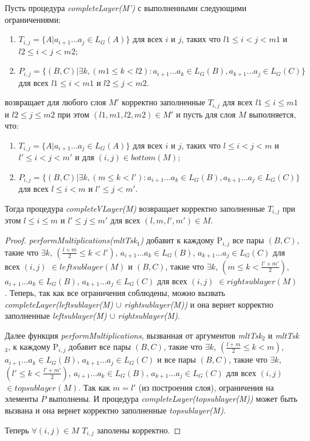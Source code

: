 \begin{lemma}
Пусть процедура \textit{completeLayer(M')} с выполненными следующими ограничениями:
\begin{enumerate}
  \item $T_{i, j} = \{ A |  a_{i + 1} \dots a_{j} \in L_G(A)\}$ для всех $i$ и $j$, таких что $l1 \leq i < j < m1$ и $l2 \leq i < j < m2$;
  \item $P_{i, j} =  \{ (B, C) |\exists k, (m1 \le k < l2): a_{i + 1} \dots a_{k} \in L_G(B), a_{k + 1} \dots a_{j} \in L_G(C)\}$ для всех $l1 \leq i < m1$ и $l2 \leq j < m2$.
\end{enumerate}
возвращает для любого слоя $M'$ корректно заполненные $T_{i, j}$ для всех $l1 \leq i \le m1$ и $l2 \leq j \le m2$ при этом $(l1, m1, l2, m2) \in M'$
и пусть для слоя $M$ выполняется, что:
\begin{enumerate}
  \item $T_{i, j} = \{ A |  a_{i + 1} \dots a_{j} \in L_G(A)\}$ для всех $i$ и $j$, таких что $l \leq i < j < m$ и $l' \leq i < j < m'$ и для $(i, j) \in bottom(M)$;
  \item $P_{i, j} =  \{ (B, C) |\exists k, (m \le k < l'): a_{i + 1} \dots a_{k} \in L_G(B), a_{k + 1} \dots a_{j} \in L_G(C)\}$ для всех $l \leq i < m$ и $l' \leq j < m'$.
\end{enumerate}

Тогда процедура \textit{completeVLayer(M)} возвращает корректно заполненные $T_{i, j}$ при этом $l \leq i \le m$ и $l' \leq j \le m'$ для всех $(l, m, l', m') \in M$.
\end{lemma}

\begin{proof}

\textit{performMultiplications(mltTsk$_1$)} добавит к каждому P$_{i,j}$ все пары
$(B, C)$, такие что $\exists k$, $(\frac{l+m}{2} \le k < l')$, $a_{i + 1} \dots a_{k} \in L_{G}(B)$, $a_{k + 1} \dots a_{j} \in L_{G}(C)$ для всех $(i, j)$ $\in leftsublayer(M)$
и
$(B, C)$, такие что $\exists k$, $(m \le k < \frac{l'+m'}{2})$, $a_{i + 1} \dots a_{k} \in L_{G}(B)$, $a_{k + 1} \dots a_{j} \in L_{G}(C)$ для всех $(i, j)$ $\in rightsublayer(M)$.
Теперь, так как все ограничения соблюдены, можно вызвать \textit{completeLayer(leftsublayer(M) $\cup$ rightsublayer(M))} и она вернет корректно заполненные \textit{leftsublayer(M) $\cup$ rightsublayer(M)}.

Далее функция \textit{performMultiplications}, вызванная от аргументов
\textit{mltTsk$_2$} и \textit{mltTsk$_3$}, к каждому P$_{i,j}$ добавит все пары
$(B, C)$, такие что $\exists k$, $(\frac{l+m}{2} \le k < m)$, $a_{i + 1} \dots a_{k} \in L_{G}(B)$, $a_{k + 1} \dots a_{j} \in L_{G}(C)$
и все пары
$(B, C)$, такие что $\exists k$, $(l' \le k < \frac{l'+m'}{2})$, $a_{i + 1} \dots a_{k} \in L_{G}(B)$, $a_{k + 1} \dots a_{j} \in L_{G}(C)$
для всех $(i, j)$ $\in topsublayer(M)$.
Так как $m = l'$ (из построения слоя), ограничения на элементы $P$ выполнены.
И процедура \textit{completeLayer(topsublayer(M))} может быть вызвана и она вернет корректно заполненные \textit{topsublayer(M)}.

Теперь $\forall (i, j) \in M$ $T_{i, j}$ заполены корректно.

\end{proof}

